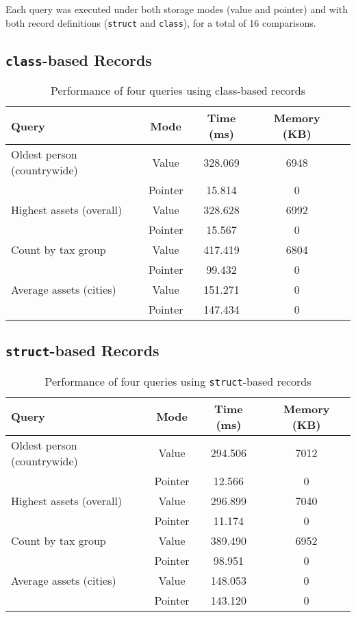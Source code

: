 \documentclass[11pt,letterpaper,oneside]{article}
\begin{document}
Each query was executed under both storage modes (value and pointer) and with
both record definitions (\texttt{struct} and \texttt{class}), for a total of 16
comparisons.

\subsection{\texttt{class}-based Records}

\begin{table}[H]
\centering
\begin{tabular}{|l|c|c|c|c|}
\hline
\textbf{Query} & \textbf{Mode} & \textbf{Time (ms)} & \textbf{Memory (KB)} \\
\hline
Oldest person (countrywide) & Value   & 328.069 & 6948 \\
                            & Pointer & 15.814  & 0    \\
\hline
Highest assets (overall)    & Value   & 328.628 & 6992 \\
                            & Pointer & 15.567  & 0    \\
\hline
Count by tax group          & Value   & 417.419 & 6804 \\
                            & Pointer & 99.432  & 0    \\
\hline
Average assets (cities)     & Value   & 151.271 & 0    \\
                            & Pointer & 147.434 & 0    \\
\hline
\end{tabular}
\caption{Performance of four queries using class-based records}
\end{table}

\subsection{\texttt{struct}-based Records}

\begin{table}[H]
\centering
\begin{tabular}{|l|c|c|c|}
\hline
\textbf{Query} & \textbf{Mode} & \textbf{Time (ms)} & \textbf{Memory (KB)} \\
\hline
Oldest person (countrywide) & Value   & 294.506 & 7012 \\
                            & Pointer & 12.566  & 0    \\
\hline
Highest assets (overall)    & Value   & 296.899 & 7040 \\
                            & Pointer & 11.174  & 0    \\
\hline
Count by tax group          & Value   & 389.490 & 6952 \\
                            & Pointer & 98.951  & 0    \\
\hline
Average assets (cities)     & Value   & 148.053 & 0    \\
                            & Pointer & 143.120 & 0    \\
\hline
\end{tabular}
\caption{Performance of four queries using \texttt{struct}-based records}
\end{table}
\end{document}
